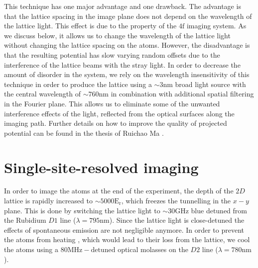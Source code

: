 This technique has one major advantage and one drawback. The advantage is that the lattice spacing in the image plane does not depend on the wavelength of the lattice light. This effect is due to the property of the $4\mathrm{f}$ imaging system. As we discuss below, it allows us to change the wavelength of the lattice light without changing the lattice spacing on the atoms. However, the disadvantage is that the resulting potential has slow varying random offsets due to the interference of the lattice beams with the stray light. In order to decrease the amount of disorder in the system, we rely on the wavelength insensitivity of this technique in order to produce the lattice using a $\sim 3\mathrm{nm}$ broad light source with the central wavelength of $\sim 760\mathrm{nm}$ in combination with additional spatial filtering in the Fourier plane. This allows us to eliminate some of the unwanted interference effects of the light, reflected from the optical surfaces along the imaging path. Further details on how to improve the quality of projected potential can be found in the thesis of Ruichao Ma \cite{MaThesis}.

\section{Single-site-resolved imaging}
In order to image the atoms at the end of the experiment, the depth of the $2D$ lattice is rapidly increased to $\sim 5000 \mathrm{E_r}$, which freezes the tunnelling in the $x-y$ plane. This is done by switching the lattice light to $\sim 30\mathrm{GHz}$ blue detuned from the Rubidium $D1$ line ($\lambda = 795\mathrm{nm}$). Since the lattice light is close-detuned the effects of spontaneous emission are not negligible anymore. In order to prevent the atoms from heating \cite{Gerbier2010,Pichler2010}, which would lead to their loss from the lattice, we cool the atoms using a $80\mathrm{MHz-detuned}$ optical molasses on the $D2$ line ($\lambda = 780\mathrm{nm}$). 

